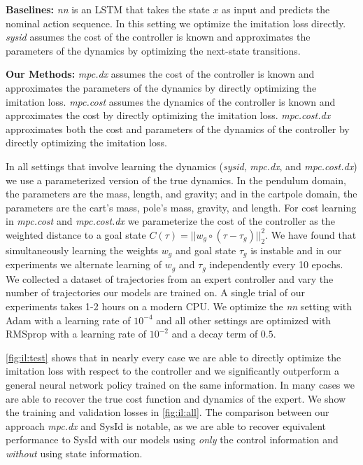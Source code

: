 \textbf{Baselines:}
\emph{nn} is an LSTM that takes the state $x$ as input and
predicts the nominal action sequence.
In this setting we optimize the imitation loss directly.
\emph{sysid} assumes the cost of the controller is known and
approximates the parameters of the dynamics by optimizing the
next-state transitions.

\textbf{Our Methods:}
\emph{mpc.dx}
assumes the cost of the controller is known and
approximates the parameters of the dynamics by directly
optimizing the imitation loss.
\emph{mpc.cost} assumes the dynamics of the controller
is known and approximates the cost by directly optimizing
the imitation loss.
\emph{mpc.cost.dx} approximates both the cost and parameters of the
dynamics of the controller by directly optimizing
the imitation loss.

In all settings that involve learning the dynamics
(\emph{sysid}, \emph{mpc.dx}, and \emph{mpc.cost.dx})
we use a parameterized version of the true dynamics.
In the pendulum domain, the parameters are the mass, length, and gravity;
and in the cartpole domain, the parameters are the cart's mass,
pole's mass, gravity, and length.
For cost learning in \emph{mpc.cost} and \emph{mpc.cost.dx} we
parameterize the cost of the controller as the weighted distance
to a goal state $C(\tau)=||w_g\circ(\tau-\tau_g)||_2^2$.
We have found that simultaneously learning the
weights $w_g$ and goal state $\tau_g$ is instable and
in our experiments we alternate learning of $w_g$
and $\tau_g$ independently every 10 epochs.
We collected a dataset of trajectories from an
expert controller and vary the number of trajectories our
models are trained on.
A single trial of our experiments takes 1-2 hours on a modern CPU.
We optimize the \emph{nn} setting with Adam \citep{kingma2014adam} with
a learning rate of $10^{-4}$ and all other settings are optimized
with RMSprop \citep{tieleman2012lecture} with a learning rate of
$10^{-2}$ and a decay term of $0.5$.

\cref{fig:il:test} shows that in nearly every case we
are able to directly optimize the imitation loss with respect
to the controller and we significantly outperform a general
neural network policy trained on the same information.
In many cases we are able to recover the true cost function
and dynamics of the expert.
We show the training and validation losses in \cref{fig:il:all}.
The comparison between our approach \emph{mpc.dx} and SysId is notable,
as we are able to recover equivalent performance to SysId
with our models using \emph{only} the control information and
\emph{without} using state information.


